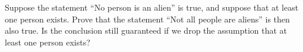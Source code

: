Suppose the statement ``No person is an alien'' is true, and suppose that at least one person exists. Prove that the statement ``Not all people are aliens'' is then also true. Is the conclusion still guaranteed if we drop the assumption that at least one person exists?
